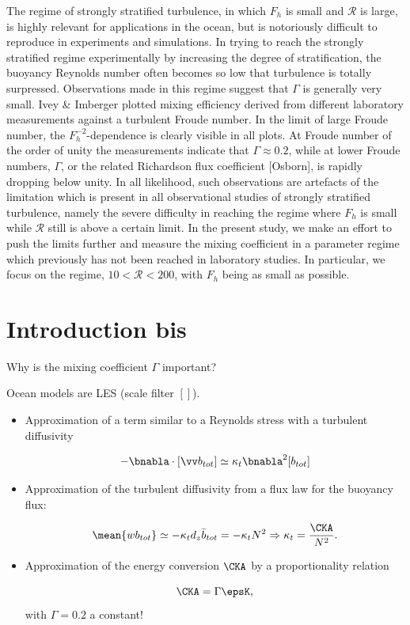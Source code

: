 The regime of strongly stratified turbulence, in which $ F_h $ is small and $
{\mathcal{R}} $ is large, is highly relevant for applications in the
ocean\cite[]{RileyDeBruynKops2003, Lindborg2006}, but is notoriously difficult
to reproduce in experiments and simulations. In trying to reach the strongly
stratified regime experimentally by increasing the degree of stratification,
the buoyancy Reynolds number often becomes so low that turbulence is totally
surpressed. Observations made in this regime suggest that $ \Gamma $ is
generally very small. Ivey \& Imberger \cite{IveyImberger1991} plotted mixing
efficiency derived from different laboratory measurements
\cite{Stillinger1983, Itsweire1986, Rohr1988, Lienhard1990} against a turbulent Froude
number. In the limit of large Froude number, the $ F_h^{-2} $-dependence is
clearly visible in all plots. At Froude number of the order of unity the
measurements indicate that $ \Gamma \approx 0.2 $, while at lower Froude
numbers, $ \Gamma $, or the related Richardson flux coefficient [Osborn], is
rapidly dropping below unity. In all likelihood, such observations are
artefacts of the limitation which is present in all observational studies of
strongly stratified turbulence, namely the severe difficulty in reaching the
regime where $ F_h $ is small while $ {\mathcal{R}} $ still is above a certain
limit. In the present study, we make an effort to push the limits further and
measure the mixing coefficient in a parameter regime which previously has not
been reached in laboratory studies. In particular, we focus on the regime, $ 10
< \mathcal{R} < 200 $, with $ F_h $ being as small as possible.


\section{Introduction bis}

Why is the mixing coefficient $\Gamma$ important?

Ocean models are LES (scale filter $[]$).

\begin{itemize}

\item Approximation of a term similar to a Reynolds stress with a turbulent diffusivity

$$- \bnabla \cdot [\vv b_{tot}] \simeq \kappa_t \bnabla^2 [b_{tot}] $$

\item Approximation of the turbulent diffusivity from a flux law for the buoyancy flux:

$$\mean{w b_{tot}} \simeq - \kappa_t d_z \bar b_{tot} = - \kappa_t N^2  \Rightarrow \kappa_t = \frac{\CKA}{N^2}.$$

\item  Approximation of the energy conversion $\CKA$ by a proportionality relation

$$ \CKA = \Gamma \epsK, $$
with $\Gamma = 0.2$ a constant!
\end{itemize}


